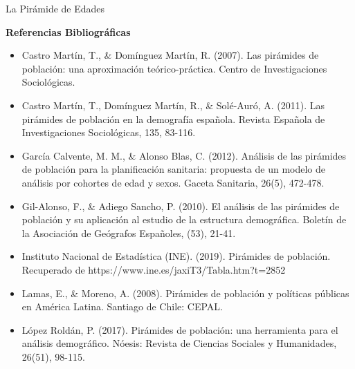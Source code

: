 \documentclass[8pt,a4paper]{beamer}
\begin{document}
{\begin{frame}{La Pirámide de Edades}
\end{frame}


\begin{frame}{\textbf{Referencias Bibliográficas}}

\begin{itemize}
\justifying
\item Castro Martín, T., \& Domínguez Martín, R. (2007). Las pirámides de población: una aproximación teórico-práctica. Centro de Investigaciones Sociológicas.

\item Castro Martín, T., Domínguez Martín, R., \& Solé-Auró, A. (2011). Las pirámides de población en la demografía española. Revista Española de Investigaciones Sociológicas, 135, 83-116.

\item García Calvente, M. M., \& Alonso Blas, C. (2012). Análisis de las pirámides de población para la planificación sanitaria: propuesta de un modelo de análisis por cohortes de edad y sexos. Gaceta Sanitaria, 26(5), 472-478.

\item Gil-Alonso, F., \& Adiego Sancho, P. (2010). El análisis de las pirámides de población y su aplicación al estudio de la estructura demográfica. Boletín de la Asociación de Geógrafos Españoles, (53), 21-41.

\item Instituto Nacional de Estadística (INE). (2019). Pirámides de población. Recuperado de https://www.ine.es/jaxiT3/Tabla.htm?t=2852

\item Lamas, E., \& Moreno, A. (2008). Pirámides de población y políticas públicas en América Latina. Santiago de Chile: CEPAL.

\item López Roldán, P. (2017). Pirámides de población: una herramienta para el análisis demográfico. Nóesis: Revista de Ciencias Sociales y Humanidades, 26(51), 98-115.
\end{itemize}

\end{frame}

}
\end{document}
